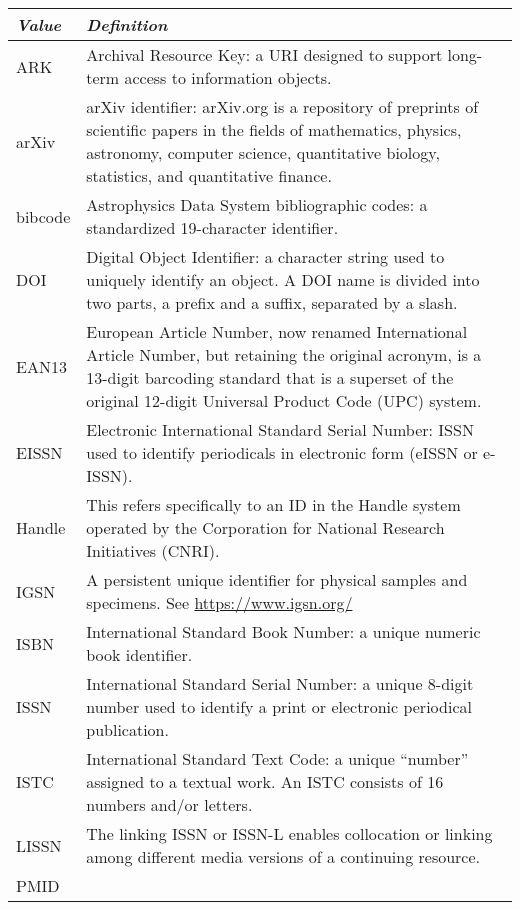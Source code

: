 \documentclass[titlepage=true,twoside=false,DIV=13]{scrartcl}
\begin{document}
\begin{longtable}{|l|p{\valdefcolw}|}
  \hline
  \emph{Value} & \emph{Definition} \\
  \hline \endhead
  \hline \endfoot\endlastfoot
  ARK     &
  Archival Resource Key: a URI designed to support long-term access to
  information objects.
  \\ \hline
  arXiv   &
  arXiv identifier: arXiv.org is a repository of preprints of
  scientific papers in the fields of mathematics, physics, astronomy,
  computer science, quantitative biology, statistics, and quantitative
  finance.
  \\ \hline
  bibcode &
  Astrophysics Data System bibliographic codes: a standardized
  19-character identifier.
  \\ \hline
  DOI     &
  Digital Object Identifier: a character string used to uniquely
  identify an object.  A DOI name is divided into two parts, a prefix
  and a suffix, separated by a slash.
  \\ \hline
  EAN13   &
  European Article Number, now renamed International Article Number,
  but retaining the original acronym, is a 13-digit barcoding standard
  that is a superset of the original 12-digit Universal Product Code
  (UPC) system.
  \\ \hline
  EISSN   &
  Electronic International Standard Serial Number: ISSN used to
  identify periodicals in electronic form (eISSN or e-ISSN).
  \\ \hline
  Handle  &
  This refers specifically to an ID in the Handle system operated by
  the Corporation for National Research Initiatives (CNRI).
  \\ \hline
  IGSN    &
  A persistent unique identifier for physical samples and specimens.
  See \url{https://www.igsn.org/}
  \\ \hline
  ISBN    &
  International Standard Book Number: a unique numeric book identifier.
  \\ \hline
  ISSN    &
  International Standard Serial Number: a unique 8-digit number used
  to identify a print or electronic periodical publication.
  \\ \hline
  ISTC    &
  International Standard Text Code: a unique ``number'' assigned to a
  textual work.  An ISTC consists of 16 numbers and/or letters.
  \\ \hline
  LISSN   &
  The linking ISSN or ISSN-L enables collocation or linking among
  different media versions of a continuing resource.
  \\ \hline
  PMID    &

\end{longtable}
\end{document}
